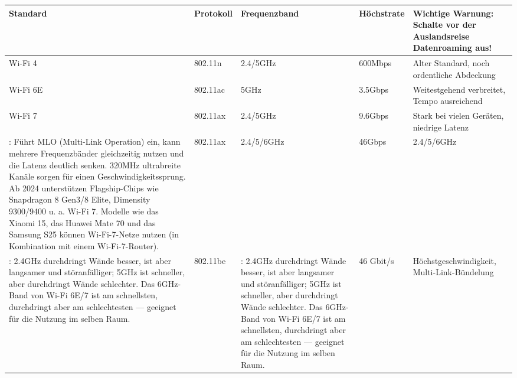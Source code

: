\begin{center}
\begin{tabularx}{\linewidth}{|X|X|X|X|X|}
\hline
\textbf{Standard} & \textbf{Protokoll} & \textbf{Frequenzband} & \textbf{Höchstrate} & \textbf{Wichtige Warnung: Schalte vor der Auslandsreise Datenroaming aus!} \tabularnewline
\hline
Wi-Fi 4 & 802.11n & 2.4/5GHz & 600Mbps & Alter Standard, noch ordentliche Abdeckung \tabularnewline
Wi-Fi 6E & 802.11ac & 5GHz & 3.5Gbps & Weitestgehend verbreitet, Tempo ausreichend \tabularnewline
Wi-Fi 7 & 802.11ax & 2.4/5GHz & 9.6Gbps & Stark bei vielen Geräten, niedrige Latenz \tabularnewline
: Führt MLO (Multi-Link Operation) ein, kann mehrere Frequenzbänder gleichzeitig nutzen und die Latenz deutlich senken. 320MHz ultrabreite Kanäle sorgen für einen Geschwindigkeitssprung. Ab 2024 unterstützen Flagship-Chips wie Snapdragon 8 Gen3/8 Elite, Dimensity 9300/9400 u. a. Wi-Fi 7. Modelle wie das Xiaomi 15, das Huawei Mate 70 und das Samsung S25 können Wi-Fi-7-Netze nutzen (in Kombination mit einem Wi-Fi-7-Router). & 802.11ax & 2.4/5/6GHz & 46Gbps & 2.4/5/6GHz \tabularnewline
: 2.4GHz durchdringt Wände besser, ist aber langsamer und störanfälliger; 5GHz ist schneller, aber durchdringt Wände schlechter. Das 6GHz-Band von Wi-Fi 6E/7 ist am schnellsten, durchdringt aber am schlechtesten — geeignet für die Nutzung im selben Raum. & 802.11be & : 2.4GHz durchdringt Wände besser, ist aber langsamer und störanfälliger; 5GHz ist schneller, aber durchdringt Wände schlechter. Das 6GHz-Band von Wi-Fi 6E/7 ist am schnellsten, durchdringt aber am schlechtesten — geeignet für die Nutzung im selben Raum. & 46 Gbit/s & Höchstgeschwindigkeit, Multi-Link-Bündelung \tabularnewline
\hline
\end{tabularx}
\end{center}

